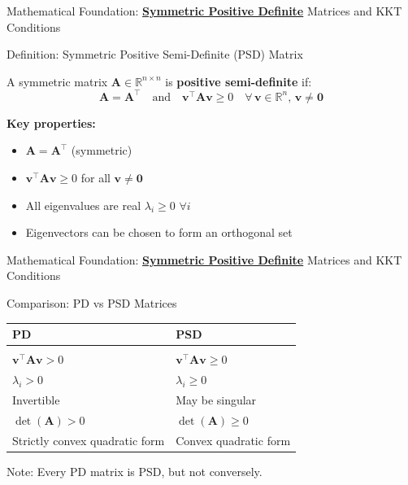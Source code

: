 \documentclass{beamer}
\begin{document}
\begin{frame}{Mathematical Foundation: \textbf{\underline{Symmetric Positive Definite}} Matrices and KKT Conditions}

\begin{block}{Definition: Symmetric Positive Semi-Definite (PSD) Matrix}

A symmetric matrix $\bm{A} \in \mathbb{R}^{n \times n}$ is \textbf{positive semi-definite} if:
\[
\bm{A} = \bm{A}^\top \quad \text{and} \quad \bm{v}^\top \bm{A} \bm{v} \geq 0 \quad \forall \, \bm{v} \in \mathbb{R}^n, \, \bm{v} \neq \bm{0}
\]

\vspace{0.3cm}

\textbf{Key properties:}
\begin{itemize}
    \item $\bm{A} = \bm{A}^\top$ (symmetric)
    \item $\bm{v}^\top \bm{A} \bm{v} \geq 0$ for all $\bm{v} \neq \bm{0}$
    \item All eigenvalues are real $\lambda_i \geq 0$ $\forall i$
    \item Eigenvectors can be chosen to form an orthogonal set
\end{itemize}

\end{block}

\end{frame}

\begin{frame}{Mathematical Foundation: \textbf{\underline{Symmetric Positive Definite}} Matrices and KKT Conditions}

\begin{alertblock}{Comparison: PD vs PSD Matrices}

\begin{tabular}{ll}
\textbf{PD} & \textbf{PSD} \\
\hline
\hfill \\
$\bm{v}^\top \bm{A} \bm{v} > 0$ & $\bm{v}^\top \bm{A} \bm{v} \geq 0$ \\
$\lambda_i > 0$ & $\lambda_i \geq 0$ \\
Invertible & May be singular \\
$\det(\bm{A}) > 0$ & $\det(\bm{A}) \geq 0$ \\
Strictly convex quadratic form & Convex quadratic form \\
\end{tabular}

\vspace{0.3cm}

Note: Every PD matrix is PSD, but not conversely.

\end{alertblock}

\end{frame}
\end{document}
